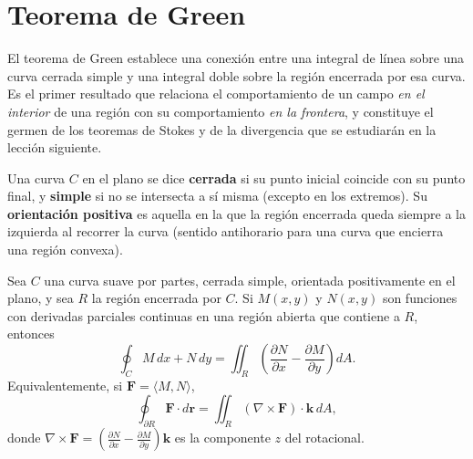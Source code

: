 \section{Teorema de Green}

El teorema de Green establece una conexión entre una integral de línea
sobre una curva cerrada simple y una integral doble sobre la región
encerrada por esa curva. Es el primer resultado que relaciona el
comportamiento de un campo \emph{en el interior} de una región con su
comportamiento \emph{en la frontera}, y constituye el germen de los
teoremas de Stokes y de la divergencia que se estudiarán en la lección
siguiente.

\begin{definition}
Una curva $C$ en el plano se dice \textbf{cerrada} si su punto inicial
coincide con su punto final, y \textbf{simple} si no se intersecta a sí
misma (excepto en los extremos). Su \textbf{orientación positiva} es
aquella en la que la región encerrada queda siempre a la izquierda al
recorrer la curva (sentido antihorario para una curva que encierra una
región convexa).
\end{definition}

\begin{theorem}
Sea $C$ una curva suave por partes, cerrada simple, orientada
positivamente en el plano, y sea $R$ la región encerrada por $C$.
Si $M(x,y)$ y $N(x,y)$ son funciones con derivadas parciales continuas
en una región abierta que contiene a $R$, entonces
\[
\oint_C M\,dx + N\,dy
= \iint_R \left( \frac{\partial N}{\partial x} - \frac{\partial M}{\partial y} \right) dA.
\]
Equivalentemente, si $\mathbf{F} = \langle M, N \rangle$,
\[
\oint_{\partial R} \mathbf{F} \cdot d\mathbf{r}
= \iint_R (\nabla \times \mathbf{F}) \cdot \mathbf{k} \, dA,
\]
donde $\nabla \times \mathbf{F} = \left( \frac{\partial N}{\partial x}
- \frac{\partial M}{\partial y} \right) \mathbf{k}$ es la componente
$z$ del rotacional.
\end{theorem}

